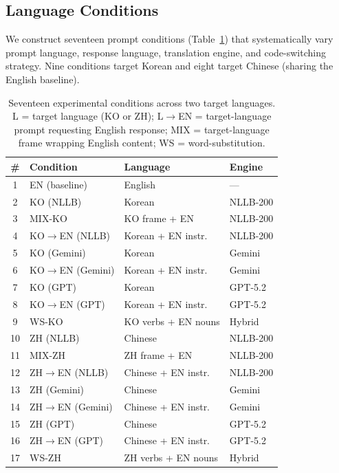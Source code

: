 \documentclass[AMS,STIX2COL]{WileyNJD-v2}
\begin{document}
\subsection{Language Conditions}
\label{sec:conditions}

We construct seventeen prompt conditions (Table~\ref{tab:conditions})
that systematically vary prompt language, response language, translation
engine, and code-switching strategy.
Nine conditions target Korean and eight target Chinese
(sharing the English baseline).

\begin{table}[t]
\centering
\caption{Seventeen experimental conditions across two target languages.
L = target language (KO or ZH);
L$\to$EN = target-language prompt requesting English response;
MIX = target-language frame wrapping English content;
WS = word-substitution.}
\label{tab:conditions}
\small
\begin{tabular}{@{}c l l l@{}}
\toprule
\textbf{\#} & \textbf{Condition} & \textbf{Language} & \textbf{Engine} \\
\midrule
1 & EN (baseline) & English & --- \\
\midrule
2 & KO (NLLB) & Korean & NLLB-200 \\
3 & MIX-KO & KO frame + EN & NLLB-200 \\
4 & KO$\to$EN (NLLB) & Korean + EN instr. & NLLB-200 \\
5 & KO (Gemini) & Korean & Gemini \\
6 & KO$\to$EN (Gemini) & Korean + EN instr. & Gemini \\
7 & KO (GPT) & Korean & GPT-5.2 \\
8 & KO$\to$EN (GPT) & Korean + EN instr. & GPT-5.2 \\
9 & WS-KO & KO verbs + EN nouns & Hybrid \\
\midrule
10 & ZH (NLLB) & Chinese & NLLB-200 \\
11 & MIX-ZH & ZH frame + EN & NLLB-200 \\
12 & ZH$\to$EN (NLLB) & Chinese + EN instr. & NLLB-200 \\
13 & ZH (Gemini) & Chinese & Gemini \\
14 & ZH$\to$EN (Gemini) & Chinese + EN instr. & Gemini \\
15 & ZH (GPT) & Chinese & GPT-5.2 \\
16 & ZH$\to$EN (GPT) & Chinese + EN instr. & GPT-5.2 \\
17 & WS-ZH & ZH verbs + EN nouns & Hybrid \\
\bottomrule
\end{tabular}
\end{table}
\end{document}
